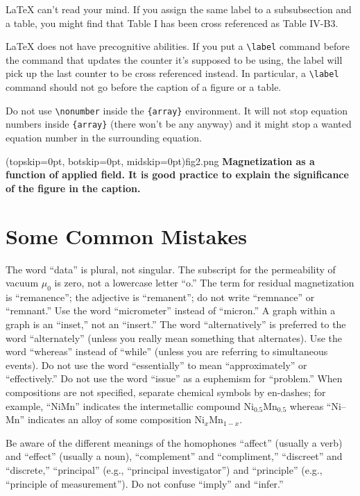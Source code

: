 \documentclass{ieeeaccess}
\begin{document}
{\LaTeX} can't read your mind. If you assign the same label to a
subsubsection and a table, you might find that Table I has been cross
referenced as Table IV-B3.

{\LaTeX} does not have precognitive abilities. If you put a
\verb|\label| command before the command that updates the counter it's
supposed to be using, the label will pick up the last counter to be
cross referenced instead. In particular, a \verb|\label| command
should not go before the caption of a figure or a table.

Do not use \verb|\nonumber| inside the \verb|{array}| environment. It
will not stop equation numbers inside \verb|{array}| (there won't be
any anyway) and it might stop a wanted equation number in the
surrounding equation.


\Figure[t!](topskip=0pt, botskip=0pt, midskip=0pt){fig2.png}
{ \textbf{Magnetization as a function of applied field.
It is good practice to explain the significance of the figure in the caption.}\label{fig2}}

\section{Some Common Mistakes}
The word ``data'' is plural, not singular. The subscript for the
permeability of vacuum $\mu _{0}$ is zero, not a lowercase letter
``o.'' The term for residual magnetization is ``remanence''; the adjective
is ``remanent''; do not write ``remnance'' or ``remnant.'' Use the word
``micrometer'' instead of ``micron.'' A graph within a graph is an
``inset,'' not an ``insert.'' The word ``alternatively'' is preferred to the
word ``alternately'' (unless you really mean something that alternates). Use
the word ``whereas'' instead of ``while'' (unless you are referring to
simultaneous events). Do not use the word ``essentially'' to mean
``approximately'' or ``effectively.'' Do not use the word ``issue'' as a
euphemism for ``problem.'' When compositions are not specified, separate
chemical symbols by en-dashes; for example, ``NiMn'' indicates the
intermetallic compound Ni$_{0.5}$Mn$_{0.5}$ whereas
``Ni--Mn'' indicates an alloy of some composition
Ni$_{x}$Mn$_{1-x}$.

Be aware of the different meanings of the homophones ``affect'' (usually a
verb) and ``effect'' (usually a noun), ``complement'' and ``compliment,''
``discreet'' and ``discrete,'' ``principal'' (e.g., ``principal
investigator'') and ``principle'' (e.g., ``principle of measurement''). Do
not confuse ``imply'' and ``infer.''
\end{document}
